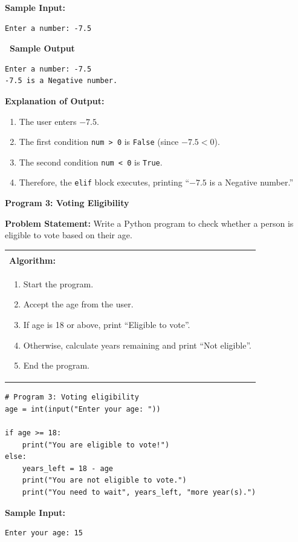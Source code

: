 \documentclass[12pt,a4paper]{article}
\makeatletter
\newcommand{\outhead}{\noindent\colorbox{cmrgreen!25}%
  {\textbf{\small\color{cmrdark}~Sample Output~}}\par\vspace{-1pt}}
\newenvironment{algobox}{%
  \par\vspace{4pt}%
  \noindent\begin{tabular}{@{}p{\linewidth}@{}}%
  \hline\\[-8pt]%
  \textbf{\color{blue!60!black}\small Algorithm:}\\[2pt]%
}{%
  \\[-4pt]\hline%
  \end{tabular}\par\vspace{4pt}%
}
\makeatother
\begin{document}
\textbf{Sample Input:}
\begin{verbatim}
Enter a number: -7.5
\end{verbatim}

\outhead
\begin{lstlisting}[style=outputstyle]
Enter a number: -7.5
-7.5 is a Negative number.
\end{lstlisting}

\textbf{Explanation of Output:}
\begin{enumerate}
  \item The user enters $-7.5$.
  \item The first condition \texttt{num > 0} is \texttt{False} (since $-7.5 < 0$).
  \item The second condition \texttt{num < 0} is \texttt{True}.
  \item Therefore, the \texttt{elif} block executes, printing ``$-7.5$ is a Negative number.''
\end{enumerate}

\vspace{0.5cm}

\textbf{Program 3: Voting Eligibility}

\textbf{Problem Statement:}
Write a Python program to check whether a person is eligible to vote based on their age.

\begin{algobox}
\begin{enumerate}[label=Step \arabic*:]
  \item Start the program.
  \item Accept the age from the user.
  \item If age is 18 or above, print ``Eligible to vote''.
  \item Otherwise, calculate years remaining and print ``Not eligible''.
  \item End the program.
\end{enumerate}
\end{algobox}

\begin{lstlisting}
# Program 3: Voting eligibility
age = int(input("Enter your age: "))

if age >= 18:
    print("You are eligible to vote!")
else:
    years_left = 18 - age
    print("You are not eligible to vote.")
    print("You need to wait", years_left, "more year(s).")
\end{lstlisting}

\textbf{Sample Input:}
\begin{verbatim}
Enter your age: 15
\end{verbatim}
\end{document}
